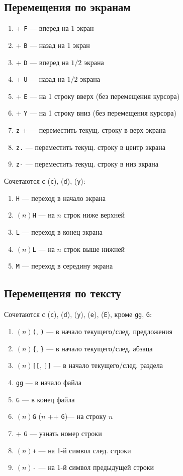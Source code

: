 \documentclass[a4paper,10pt, twocolumn]{article}
\newcommand*{\cod}[1]{\texttt{#1}}
\begin{document}
\subsection{Перемещения по экранам}
\begin{enumerate}
    \item \Ctrl + \cod{F} --- вперед на 1 экран 
    \item \Ctrl + \cod{B} --- назад на 1 экран
    \item \Ctrl + \cod{D} --- вперед на $1/2$ экрана
    \item \Ctrl + \cod{U} --- назад на $1/2$ экрана
    \item \Ctrl + \cod{E} --- на 1 строку вверх (без перемещения курсора)
    \item \Ctrl + \cod{Y} --- на 1 строку вниз (без перемещения курсора)
    \item \cod{z} + \Enter --- переместить текущ. строку в верх экрана
    \item \cod{z.} --- переместить текущ. строку в центр экрана
    \item \cod{z-} --- переместить текущ. строку в низ экрана
\end{enumerate}
Сочетаются с (\cod{c}), (\cod{d}), (\cod{y}):
\begin{enumerate}
    \item \cod{H} --- переход в начало экрана
    \item $(n)$\cod{H} --- на $n$ строк ниже верхней
    \item \cod{L} --- переход в конец экрана
    \item $(n)$\cod{L} --- на $n$ строк выше нижней
    \item \cod{M} --- переход в середину экрана
\end{enumerate}

\subsection{Перемещения по тексту}
Сочетаются с (\cod{c}), (\cod{d}), (\cod{y}), (\cod{e}), (\cod{E}), кроме \cod{gg}, \cod{G}:
\begin{enumerate}
    \item $(n)$\cod{(}, \cod{)} --- в начало текущего/след. предложения
    \item $(n)$\cod{\{}, \cod{\}} --- в начало текущего/след. абзаца
    \item $(n)$\cod{[[}, \cod{]]} --- в начало текущего/след. раздела
    \item \cod{gg} --- в начало файла
    \item \cod{G} --- в конец файла
    \item $(n)$\cod{G} ($n$ +\Ctrl + \cod{G})--- на строку $n$\
    \item \Ctrl + \cod{G} --- узнать номер строки
    \item $(n)$\cod{+} --- на 1-й символ след. строки
    \item $(n)$\cod{-} --- на 1-й символ предыдущей строки
\end{enumerate}
\end{document}
